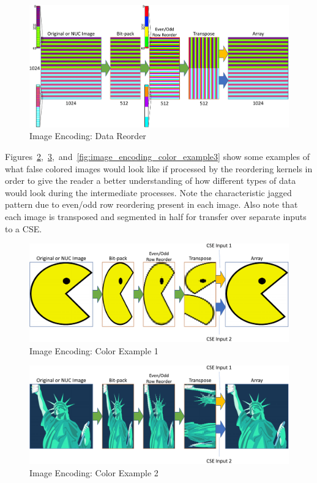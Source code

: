     \begin{figure}
        \centering
        \includegraphics[width=1.0\textwidth]{fig/image_encoding_reorder.pdf}
        \caption{Image Encoding: Data Reorder}
        \label{fig:image_encoding_bitpack_reorder}
    \end{figure}

    Figures~\ref{fig:image_encoding_color_example1},~\ref{fig:image_encoding_color_example2},~and~\ref{fig:image_encoding_color_example3} show some examples of what false colored images would look like if processed by the reordering kernels in order to give the reader a better understanding of how different types of data would look during the intermediate processes. Note the characteristic jagged pattern due to even/odd row reordering present in each image. Also note that each image is transposed and segmented in half for transfer over separate inputs to a CSE.

    \begin{figure}
        \centering
        \includegraphics[width=1.0\textwidth]{fig/image_encoding_pac.pdf}
        \caption{Image Encoding: Color Example 1}
        \label{fig:image_encoding_color_example1}
    \end{figure}

    \begin{figure}
        \centering
        \includegraphics[width=1.0\textwidth]{fig/image_encoding_liberty.pdf}
        \caption{Image Encoding: Color Example 2}
        \label{fig:image_encoding_color_example2}
    \end{figure}

